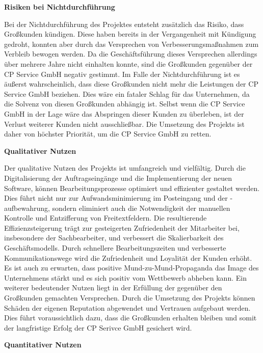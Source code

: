 \textbf{Risiken bei Nichtdurchführung}
\vspace{0.1cm}

Bei der Nichtdurchführung des Projektes entsteht zusätzlich das Risiko, dass Großkunden kündigen. Diese haben bereits in der Vergangenheit mit Kündigung gedroht, konnten aber durch das Versprechen von Verbesserungsmaßnahmen zum Verbleib bewogen werden. Da die Geschäftsführung dieses Versprechen allerdings über mehrere Jahre nicht einhalten konnte, sind die Großkunden gegenüber der CP Service GmbH negativ gestimmt. Im Falle der Nichtdurchführung ist es äußerst wahrscheinlich, dass diese Großkunden nicht mehr die Leistungen der CP Service GmbH beziehen. Dies wäre ein fataler Schlag für das Unternehmen, da die Solvenz von diesen Großkunden abhängig ist. Selbst wenn die CP Service GmbH in der Lage wäre das Abspringen dieser Kunden zu überleben, ist der Verlust weiterer Kunden nicht ausschließbar. Die Umsetzung des Projekts ist daher von höchster Priorität, um die CP Service GmbH zu retten. 

\vspace{10pt}
\textbf{Qualitativer Nutzen}
\vspace{0.1cm}

Der qualitative Nutzen des Projekts ist umfangreich und vielfältig. Durch die Digitalisierung der Auftragseingänge und die Implementierung der neuen Software, können Bearbeitungsprozesse optimiert und effizienter gestaltet werden. Dies führt nicht nur zur Aufwandsminimierung im Posteingang und der -aufbewahrung, sondern eliminiert auch die Notwendigkeit der manuellen Kontrolle und Entzifferung von Freitextfeldern. 
Die resultierende Effizienzsteigerung trägt zur gesteigerten Zufriedenheit der Mitarbeiter bei, insbesondere der Sachbearbeiter, und verbessert die Skalierbarkeit des Geschäftsmodells. Durch schnellere Bearbeitungszeiten und verbesserte Kommunikationswege wird die Zufriedenheit und Loyalität der Kunden erhöht. Es ist auch zu erwarten, dass positive Mund-zu-Mund-Propaganda das Image des Unternehmens stärkt und es sich positiv vom Wettbewerb abheben kann. Ein weiterer bedeutender Nutzen liegt in der Erfüllung der gegenüber den Großkunden gemachten Versprechen. Durch die Umsetzung des Projekts können Schäden der eigenen Reputation abgewendet und Vertrauen aufgebaut werden. Dies führt voraussichtlich dazu, dass die Großkunden erhalten bleiben und somit der langfristige Erfolg der CP Serivce GmbH gesichert wird.

\vspace{10pt}
\textbf{Quantitativer Nutzen}
\vspace{0.1cm}

